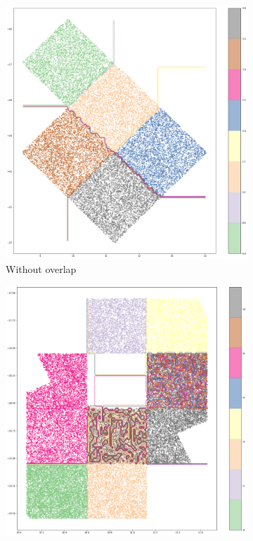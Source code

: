 
\begin{figure}[htbp]
    \begin{subfigure}[]{0.5\textwidth}
    \includegraphics[width=\textwidth]{images/A2_prototypes/tu_multifile_tree.png}
    \caption{Without overlap}\label{subfig:tu_multifile}
    \end{subfigure}
    \hfill
    \begin{subfigure}[]{0.5\textwidth}
    \includegraphics[width=\textwidth]{images/A2_prototypes/mer_multifile_tree.png}

\end{subfigure}
\end{figure}
